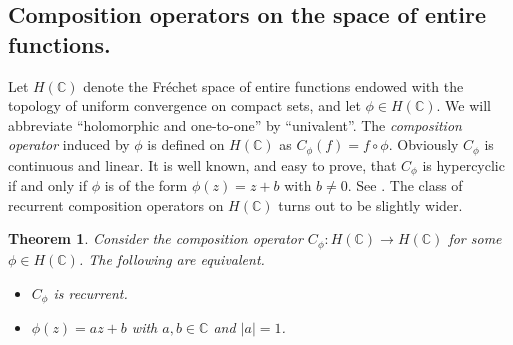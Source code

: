 \documentclass[12pt,leqno]{amsart}
\theoremstyle{plain}
\newtheorem{theorem}[equation]{Theorem}
\theoremstyle{definition}
\numberwithin{equation}{section}
\begin{document}
\subsection{Composition operators on the space of entire functions.} Let $H(\mathbb C)$ denote the Fr\'echet space of entire functions endowed with the topology of uniform convergence on compact sets, and let $\phi\in H(\mathbb C)$. We will abbreviate ``holomorphic and one-to-one'' by ``univalent''. The \emph{composition operator} induced by $\phi$ is defined on $H(\mathbb C)$ as $C_\phi(f)=f\circ \phi$. Obviously $C_\phi$ is continuous and linear. It is well known, and easy to prove, that $C_\phi$ is hypercyclic if and only if $\phi$ is of the form $\phi(z)=z+b$ with $b\neq 0$. See \cite{LuMo}. The class of recurrent composition operators on $H(\mathbb C)$ turns out to be slightly wider.

\begin{theorem}
	\label{t.h(c)} Consider the composition operator $C_\phi:H(\mathbb C)\to H(\mathbb C)$ for some $\phi \in H(\mathbb C)$. The following are equivalent. 
	\begin{itemize}
		\item[(i)] $C_{\phi}$ is recurrent. 
		\item[(ii)] $\phi(z)=az+b$ with $a,b\in\mathbb C$ and $|a|=1$. 
	\end{itemize}
\end{theorem}
\end{document}
